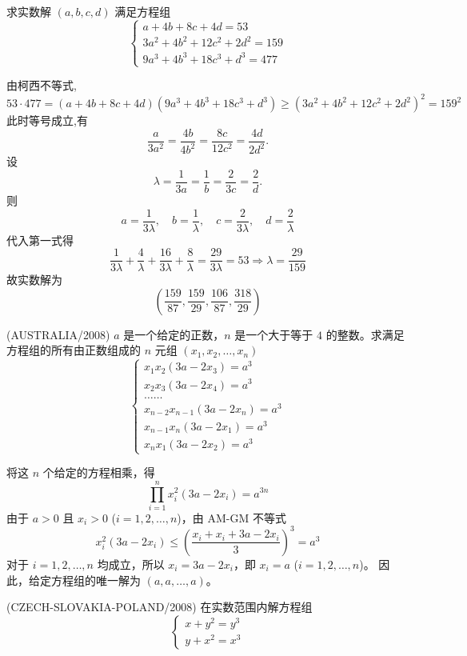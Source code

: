 \begin{questions}
    \question 求实数解 $(a, b, c, d)$ 满足方程组
    \[
    \begin{cases}
    a + 4b + 8c + 4d = 53 \\
    3a^2 + 4b^2 + 12 c^2 + 2 d^2 = 159 \\
    9a^3 + 4b^3 + 18 c^3 + d^3 = 477
    \end{cases}
    \]
    \begin{solution}
        由柯西不等式, 
        \[
        53\cdot477=(a + 4b + 8c + 4d)(9a^3 + 4b^3 + 18 c^3 + d^3)\ge (3a^2 + 4b^2 + 12 c^2 + 2 d^2)^2=159^2
        \]
        此时等号成立,有
        \[
        \frac{a}{3a^2} = \frac{4b}{4b^2} = \frac{8c}{12c^2} = \frac{4d}{2d^2}.
        \]
        设
        \[
        \lambda=\frac{1}{3a} = \frac{1}{b} = \frac{2}{3c} = \frac{2}{d}.
        \]
        则
        \[
        a = \frac{1}{3\lambda}, \quad b = \frac{1}{\lambda}, \quad c = \frac{2}{3\lambda}, \quad d = \frac{2}{\lambda}
        \]
        代入第一式得
        \[
        \frac{1}{3\lambda} + \frac{4}{\lambda} + \frac{16}{3\lambda} + \frac{8}{\lambda} =  \frac{29}{3\lambda} = 53 \Rightarrow \lambda = \frac{29}{159}
        \]
        故实数解为
        \[
        \left( \frac{159}{87}, \frac{159}{29}, \frac{106}{87}, \frac{318}{29} \right)
        \]
    \end{solution}

    \question (AUSTRALIA/2008) $a$ 是一个给定的正数，$n$ 是一个大于等于 $4$ 的整数。求满足方程组的所有由正数组成的 $n$ 元组 $(x_1, x_2, \dots, x_n)$
\[
\begin{cases}
x_1x_2(3a - 2x_3) = a^3 \\
x_2x_3(3a - 2x_4) = a^3 \\
\dots \dots \\
x_{n-2}x_{n-1}(3a - 2x_n) = a^3 \\
x_{n-1}x_n(3a - 2x_1) = a^3 \\
x_nx_1(3a - 2x_2) = a^3
\end{cases}
\]

\begin{solution}
将这 $n$ 个给定的方程相乘，得
\[
\prod_{i=1}^n x_i^2(3a - 2x_i) = a^{3n}
\]
由于 $a > 0$ 且 $x_i > 0$ ($i = 1, 2, \dots, n$)，由 AM-GM 不等式
\[
x_i^2(3a - 2x_i) \le \left( \frac{x_i + x_i + 3a - 2x_i}{3} \right)^3 = a^3
\]
对于 $i = 1, 2, \dots, n$ 均成立，所以 $x_i = 3a - 2x_i$，即 $x_i = a$ ($i = 1, 2, \dots, n$)。
因此，给定方程组的唯一解为 $(a, a, \dots, a)$。
\end{solution}

\question (CZECH-SLOVAKIA-POLAND/2008) 在实数范围内解方程组
\[
\begin{cases}
x + y^2 = y^3 \\
y + x^2 = x^3
\end{cases}
\]


\end{questions}
